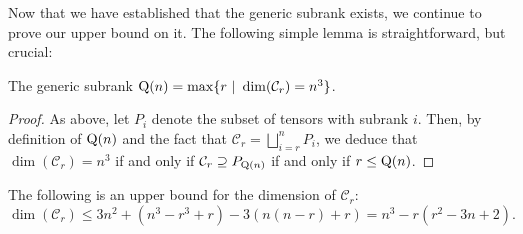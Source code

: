\documentclass[11pt]{article}
\theoremstyle{definition}
\theoremstyle{remark}
\newcommand{\gensubrank}{{\rm Q}}
\begin{document}
Now that we have established that the generic subrank exists, we continue to prove our upper bound on it.
The following simple lemma is straightforward, but crucial:
\begin{lemma} \label{lem:dimC-subrank}
The generic subrank $\gensubrank(n) = \max \{r\ |\ \dim(\mathcal{C}_r) = n^3\}$.
\end{lemma}

\begin{proof}
As above, let $P_i$ denote the subset of tensors with subrank $i$. Then, by definition of $\gensubrank(n)$ and the fact that $\mathcal{C}_r = \bigsqcup_{i =r}^n P_i$, we deduce that $\dim(\mathcal{C}_r) = n^3$ if and only if $\mathcal{C}_r \supseteq P_{\gensubrank(n)}$ if and only if $r \leq \gensubrank(n)$.
\end{proof}





\begin{proposition} \label{prop:dim-upper}
The following is an upper bound for the dimension of $\mathcal{C}_r$:
$$
\dim(\mathcal{C}_r) \leq 3n^2 + (n^3-r^3+r) - 3(n(n-r) + r) = n^3 - r(r^2-3n+2).
$$
\end{proposition}

%
\end{document}
